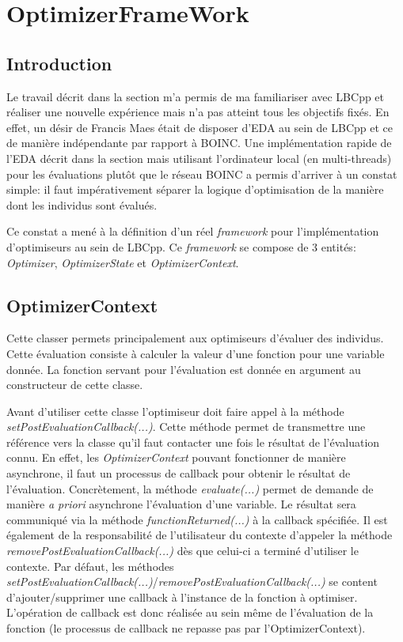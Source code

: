\documentclass[a4paper, 11pt]{report}
\begin{document}
\section{OptimizerFrameWork}
\subsection{Introduction}
Le travail décrit dans la section %
m'a permis de ma familiariser avec LBCpp et réaliser une nouvelle expérience mais n'a pas atteint tous les objectifs fixés. En effet, un désir de Francis Maes était de disposer d'EDA au sein de LBCpp et ce de manière indépendante par rapport à \textsc{BOINC}. Une implémentation rapide de l'EDA décrit dans la section %
mais utilisant l'ordinateur local (en multi-threads) pour les évaluations plutôt que le réseau \textsc{BOINC} a permis d'arriver à un constat simple: il faut impérativement séparer la logique d'optimisation de la manière dont les individus sont évalués.

Ce constat a mené à la définition d'un réel \textit{framework} pour l'implémentation d'optimiseurs au sein de LBCpp. Ce \textit{framework} se compose de 3 entités: \textit{Optimizer}, \textit{OptimizerState} et \textit{OptimizerContext}. %

\subsection{OptimizerContext}
Cette classer permets principalement aux optimiseurs d'évaluer des individus. Cette évaluation consiste à calculer la valeur d'une fonction pour une variable donnée. La fonction servant pour l'évaluation est donnée en argument au constructeur de cette classe.

Avant d'utiliser cette classe l'optimiseur doit faire appel à la méthode \textit{setPostEvaluationCallback(...)}. Cette méthode permet de transmettre une référence vers la classe qu'il faut contacter une fois le résultat de l'évaluation connu. En effet, les \textit{OptimizerContext} pouvant fonctionner de manière asynchrone, il faut un processus de callback pour obtenir le résultat de l'évaluation. Concrètement, la méthode \textit{evaluate(...)} permet de demande de manière \textit{a priori} asynchrone l'évaluation d'une variable. Le résultat sera communiqué via la méthode \textit{functionReturned(...)} à la callback spécifiée. Il est également de la responsabilité de l'utilisateur du contexte d'appeler la méthode \textit{removePostEvaluationCallback(...)} dès que celui-ci a terminé d'utiliser le contexte. Par défaut, les méthodes \textit{setPostEvaluationCallback(...)}/\textit{removePostEvaluationCallback(...)} se content d'ajouter/supprimer une callback à l'instance de la fonction à optimiser. L'opération de callback est donc réalisée au sein même de l'évaluation de la fonction (le processus de callback ne repasse pas par l'OptimizerContext).
\end{document}
